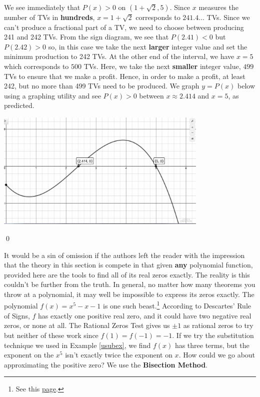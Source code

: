\begin{ex}
We see immediately that $P(x)>0$ on $(1+\sqrt{2},5)$.  Since $x$ measures the number of TVs in \textbf{hundreds}, $x = 1 + \sqrt{2}$ corresponds to $241.4\ldots$ TVs.  Since we can't produce a fractional part of a TV, we need to choose between producing 241 and 242 TVs.  From the sign diagram, we see that $P(2.41) < 0$ but $P(2.42)>0$ so, in this case we take the next \textbf{larger} integer value and set the minimum production to 242 TVs.  At the other end of the interval, we have $x=5$ which corresponds to $500$ TVs.  Here, we take the next \textbf{smaller} integer value, $499$ TVs to ensure that we make a profit.  Hence, in order to make a profit, at least 242, but no more than 499 TVs need to be produced.  We graph $y = P(x)$ below using a graphing utility and see $P(x) > 0$ between $x \approx 2.414$ and $x = 5$, as predicted.
\begin{center}

\includegraphics[width = 4in]{./RealZerosGraphics/RealZerosEx04.jpg}

\end{center}  

 \qed

\end{ex}


It would be a sin of omission if the authors left the reader with the impression that the theory in this section is compete in that given \textbf{any} polynomial function, provided here are the tools to find all of its real zeros exactly.  The reality is this couldn't be further from the truth.  In general, no matter how many theorems you throw at a polynomial, it may well be impossible to express its zeros exactly.  The polynomial $f(x) = x^5-x-1$ is one such beast.\footnote{See this \href{http://en.wikipedia.org/wiki/Galois_theory}{\underline{page}}.}  According to Descartes' Rule of Signs, $f$ has exactly one positive real zero, and it could have two negative real zeros, or none at all.  The Rational Zeros Test gives us $\pm 1$ as rational zeros to try but neither of these work since $f(1) = f(-1) = -1$.  If we try the substitution technique we used in Example \ref{usubex}, we find $f(x)$ has three terms, but the exponent on the $x^5$ isn't exactly twice the exponent on $x$.  How could we go about approximating the positive zero?   We use the  \textbf{Bisection Method}.  

